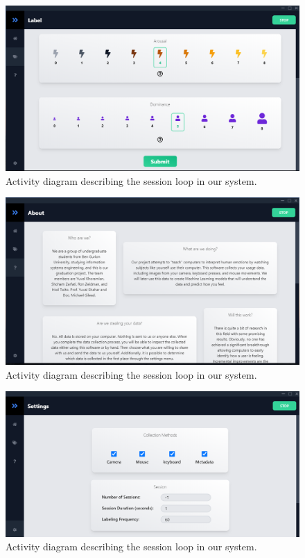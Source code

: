 \begin{figure}[htp]
    \centering
    \includegraphics[width=14cm]{figures/ui_label}   
    \caption{Activity diagram describing the session loop in our system.}
    \label{fig:ui_label} 
\end{figure}

\begin{figure}[htp]
    \centering
    \includegraphics[width=14cm]{figures/ui_about}   
    \caption{Activity diagram describing the session loop in our system.}
    \label{fig:ui_about} 
\end{figure}

\begin{figure}[htp]
    \centering
    \includegraphics[width=14cm]{figures/ui_settings}   
    \caption{Activity diagram describing the session loop in our system.}
    \label{fig:ui_settings} 
\end{figure}

